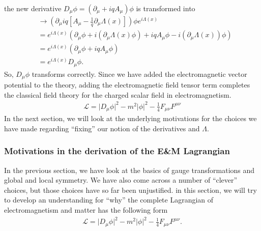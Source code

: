 \documentclass[a4paper,11pt]{article}
\numberwithin{equation}{section}
\theoremstyle{definition}
\newcommand{\p}{\partial}
\newcommand{\lag}{\mathcal{L}}
\begin{document}
the new derivative $D_\mu\phi = (\p_\mu + iqA_\mu)\phi$ is transformed into
\begin{align}
&\to \left( \p_\mu  iq\left[ A_\mu -\frac{1}{q}\p_\mu\Lambda(x)  \right] \right)\phi e^{i\Lambda(x)}\\
&= e^{i\Lambda(x)}\left( \p_\mu\phi + i(\p_\mu\Lambda(x)\phi) + iqA_\mu \phi - i(\p_\mu \Lambda(x))\phi \right)\\
&= e^{i\Lambda(x)}(\p_\mu \phi + iqA_\mu\phi)\\
&= e^{i\Lambda(x)}D_\mu\phi.
\end{align}
So, $D_\mu\phi$ transforms correctly. Since we have added the electromagnetic vector potential to the theory, adding the electromagnetic field tensor term completes the classical field theory for the charged scalar field in electromagnetism. 
\begin{align}
\boxed{\lag = \vert D_\mu \phi\vert^2 - m^2\vert \phi\vert^2 - \frac{1}{4}F_{\mu\nu}F^{\mu\nu} }
\end{align}
In the next section, we will look at the underlying motivations for the choices we have made regarding ``fixing'' our notion of the derivatives and $\Lambda$.
\subsubsection{Motivations in the derivation of the E\&M Lagrangian}
In the previous section, we have look at the basics of gauge transformations and global and local symmetry. We have also come across a number of ``clever'' choices, but those choices have so far been unjustified. in this section, we will try to develop an understanding for ``why'' the complete Lagrangian of electromagnetism and matter has the following form
\begin{align}
\lag = \vert D_\mu \phi\vert^2 - m^2\vert \phi\vert^2 - \frac{1}{4}F_{\mu\nu}F^{\mu\nu} .
\end{align} 
\end{document}
